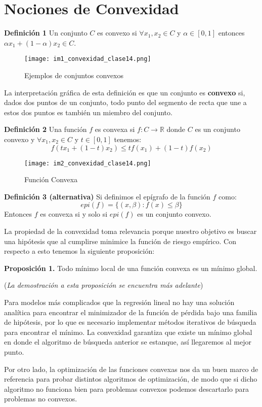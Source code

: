 \documentclass{article}
\begin{document}
\section{Nociones de Convexidad}
\textbf{Definición 1} Un conjunto $C$ es convexo si $\forall x_{1},x_{2} \in C$ y   $\alpha \in [0,1]$ entonces $\alpha x_{1}+ (1-\alpha)x_{2} \in C $.

\begin{figure}[h]
\caption{Ejemplos de conjuntos convexos}
\centering
\texttt{[image: im1\_convexidad\_clase14.png]}
\end{figure}

La interpretación gráfica de esta definición es que un conjunto es \textbf{convexo} si, dados dos puntos de un conjunto, todo punto del segmento de recta que une a estos dos puntos es también un miembro del conjunto. 

\textbf{Definición 2} Una función $f$ es convexa si $f:C\rightarrow \mathbb{R}$ donde $C$ es un conjunto convexo y $\forall x_{1},x_{2} \in C$ y $t \in [0,1]$ tenemos:
$$f(t x_{1}+(1-t)x_{2})\leq t f(x_{1})+(1-t)f(x_{2})$$
\begin{figure}[h]
\caption{Función Convexa}
\centering
\texttt{[image: im2\_convexidad\_clase14.png]}
\end{figure}

\textbf{Definición 3 (alternativa)} Si definimos el epígrafo de la función $f$ como:
$$epi(f)=\{(x,\beta): f(x)\leq \beta\}$$
Entonces $f$ es convexa si y solo si $epi(f)$ es un conjunto convexo.

\newpage
La propiedad de la convexidad toma relevancia porque nuestro objetivo es buscar una hipótesis que al cumplirse minimice la función de riesgo empírico. Con respecto a esto tenemos la siguiente proposición:

\textbf{Proposición 1.} Todo mínimo local de una función convexa es un mínimo global.

(\textit{La demostración a esta proposición se encuentra más adelante})

Para modelos más complicados que la regresión lineal no hay una solución analítica para encontrar el minimizador de la función de pérdida bajo una familia de hipótesis, por lo que es necesario implementar métodos iterativos de búsqueda para encontrar el mínimo. La convexidad garantiza que existe un mínimo global en donde el algoritmo de búsqueda anterior se estanque, así llegaremos al mejor punto.

Por otro lado, la optimización de las funciones convexas nos da un buen marco de referencia para probar distintos algoritmos de optimización, de modo que si dicho algoritmo no funciona bien para problemas convexos podemos descartarlo para problemas no convexos.
\end{document}
